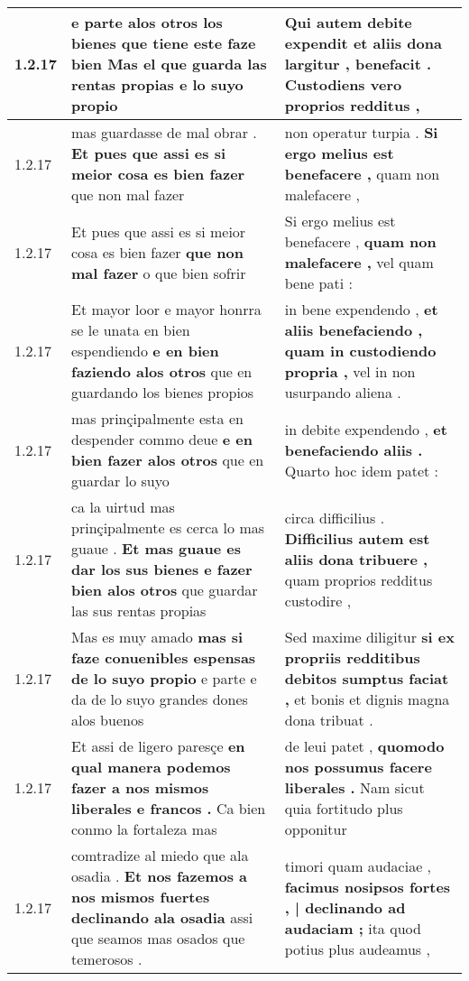 \begin{tabular}{|p{1cm}|p{6.5cm}|p{6.5cm}|}
1.2.17 & e parte alos otros los bienes \textbf{ que tiene este faze bien } Mas el que guarda las rentas propias e lo suyo propio & Qui autem debite expendit \textbf{ et aliis dona largitur , benefacit . } Custodiens vero proprios redditus , \\\hline
1.2.17 & mas guardasse de mal obrar . \textbf{ Et pues que assi es si meior cosa es bien fazer } que non mal fazer & non operatur turpia . \textbf{ Si ergo melius est benefacere , } quam non malefacere , \\\hline
1.2.17 & Et pues que assi es si meior cosa es bien fazer \textbf{ que non mal fazer } o que bien sofrir & Si ergo melius est benefacere , \textbf{ quam non malefacere , } vel quam bene pati : \\\hline
1.2.17 & Et mayor loor e mayor honrra se le unata en bien espendiendo \textbf{ e en bien faziendo alos otros } que en guardando los bienes propios & in bene expendendo , \textbf{ et aliis benefaciendo , quam in custodiendo propria , } vel in non usurpando aliena . \\\hline
1.2.17 & mas prinçipalmente esta en despender commo deue \textbf{ e en bien fazer alos otros } que en guardar lo suyo & in debite expendendo , \textbf{ et benefaciendo aliis . } Quarto hoc idem patet : \\\hline
1.2.17 & ca la uirtud mas prinçipalmente es cerca lo mas guaue . \textbf{ Et mas guaue es dar los sus bienes e fazer bien alos otros } que guardar las sus rentas propias & circa difficilius . \textbf{ Difficilius autem est aliis dona tribuere , } quam proprios redditus custodire , \\\hline
1.2.17 & Mas es muy amado \textbf{ mas si faze conuenibles espensas de lo suyo propio } e parte e da de lo suyo grandes dones alos buenos & Sed maxime diligitur \textbf{ si ex propriis redditibus debitos sumptus faciat , } et bonis et dignis magna dona tribuat . \\\hline
1.2.17 & Et assi de ligero paresçe \textbf{ en qual manera podemos fazer a nos mismos liberales e francos . } Ca bien conmo la fortaleza mas & de leui patet , \textbf{ quomodo nos possumus facere liberales . } Nam sicut quia fortitudo plus opponitur \\\hline
1.2.17 & comtradize al miedo que ala osadia . \textbf{ Et nos fazemos a nos mismos fuertes declinando ala osadia } assi que seamos mas osados que temerosos . & timori quam audaciae , \textbf{ facimus nosipsos fortes , | declinando ad audaciam ; } ita quod potius plus audeamus , \\\hline

\end{tabular}

